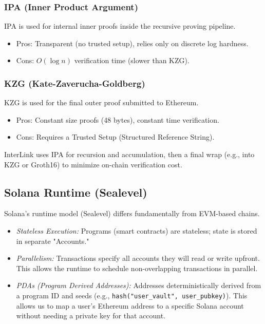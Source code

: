 \documentclass[11pt,a4paper]{article}
\begin{document}
\subsubsection{IPA (Inner Product Argument)}
IPA is used for internal inner proofs inside the recursive proving pipeline.
\begin{itemize}
    \item Pros: Transparent (no trusted setup), relies only on discrete log hardness.
    \item Cons: $O(\log n)$ verification time (slower than KZG).
\end{itemize}

\subsubsection{KZG (Kate-Zaverucha-Goldberg)}
KZG is used for the final outer proof submitted to Ethereum.
\begin{itemize}
    \item Pros: Constant size proofs (48 bytes), constant time verification.
    \item Cons: Requires a Trusted Setup (Structured Reference String).
\end{itemize}

InterLink uses IPA for recursion and accumulation, then a final wrap (e.g., into KZG or Groth16) to minimize on-chain verification cost.

\subsection{Solana Runtime (Sealevel)}
Solana's runtime model (Sealevel) differs fundamentally from EVM-based chains.
\begin{itemize}
    \item \textit{Stateless Execution:} Programs (smart contracts) are stateless; state is stored in separate "Accounts."
    \item \textit{Parallelism:} Transactions specify all accounts they will read or write upfront. This allows the runtime to schedule non-overlapping transactions in parallel.
    \item \textit{PDAs (Program Derived Addresses):} Addresses deterministically derived from a program ID and seeds (e.g., \texttt{hash("user\_vault", user\_pubkey)}). This allows us to map a user's Ethereum address to a specific Solana account without needing a private key for that account.
\end{itemize}
\end{document}
